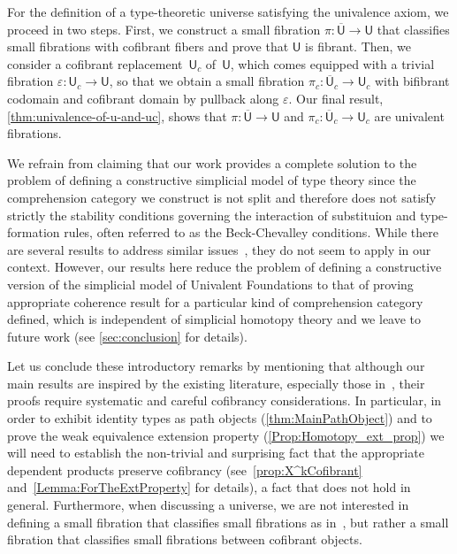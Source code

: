 \documentclass[reqno,10pt,a4paper,oneside]{amsart}
\numberwithin{equation}{section}
\theoremstyle{mythm}
\theoremstyle{mydef}
\theoremstyle{myrmk}
\newcommand{\co}{\colon}
\newcommand{\UU}{\overline{\mathsf{U}}}
\newcommand{\U}{\mathsf{U}}
\begin{document}
For the definition of a  type-theoretic universe satisfying the univalence axiom, we proceed
in two steps. First, we construct a small fibration $\pi \co \UU \to \U$ that classifies small fibrations with cofibrant fibers and prove that $\U$ is fibrant. 
Then, we consider a cofibrant replacement~$\U_c$ of~$\U$, which comes equipped with a trivial fibration $\varepsilon \co \U_c \to \U$, so that 
we obtain a small fibration $\pi_c \co \UU_c \to \U_c$ with bifibrant codomain and cofibrant domain by pullback along $\varepsilon$. Our final result, \cref{thm:univalence-of-u-and-uc}, shows that
$\pi \co \UU \to \U$ and $\pi_c \co \UU_c \to \U_c$ are univalent fibrations. 





We refrain from claiming that our work provides a complete solution to the problem of defining a constructive simplicial model of type theory since the comprehension category we construct is not split and therefore does not
satisfy strictly the stability conditions governing the interaction of substituion and type-formation rules, often
referred to as the Beck-Chevalley conditions. While there are several results to address similar issues~\cite{clairambaultdybjer2014,HofmannM:intttl,voevodsky-simplicial-model,LumsdaineP:locuoc,ShulmanM:allths}, they do not seem to apply in our  context. However, our results here reduce the problem of defining a constructive version of the simplicial model of Univalent Foundations to that of proving appropriate coherence result for a particular kind of 
comprehension category defined, which is independent of simplicial homotopy theory  and we leave to future work (see \cref{sec:conclusion} for
details).

Let us conclude these introductory remarks by mentioning that although our main results are inspired by the existing literature, especially those in~\cite{voevodsky-simplicial-model}, their proofs require systematic and careful cofibrancy considerations. In particular, in order to 
exhibit identity types as path objects (\cref{thm:MainPathObject}) and to prove the weak equivalence
extension property (\cref{Prop:Homotopy_ext_prop}) we will need to establish the non-trivial
and surprising fact that the appropriate dependent products preserve cofibrancy (see~\cref{prop:X^kCofibrant} and~\cref{Lemma:ForTheExtProperty} for details), a 
fact that does not hold in general. Furthermore, when discussing a universe, we are not interested in defining a small fibration that classifies small fibrations as in~\cite{voevodsky-simplicial-model}, but
rather a small fibration that classifies small fibrations between cofibrant objects. 
\end{document}
